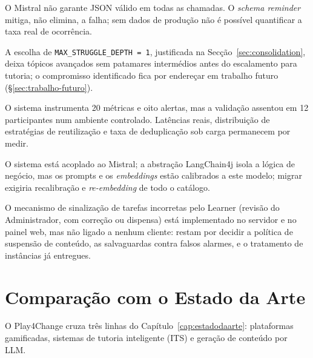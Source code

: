 \begin{description}[style=nextline, font=\bfseries]

\item[Conformidade de schema do LLM]
O Mistral não garante JSON válido em todas as chamadas. O \textit{schema reminder} mitiga, não elimina, a falha; sem dados de produção não é possível quantificar a taxa real de ocorrência.

\item[Profundidade fixa de struggle]
A escolha de \texttt{MAX\_STRUGGLE\_DEPTH~=~1}, justificada na Secção~\ref{sec:consolidation}, deixa tópicos avançados sem patamares intermédios antes do escalamento para tutoria; o compromisso identificado fica por endereçar em trabalho futuro (§\ref{sec:trabalho-futuro}).

\item[Falta de dados de produção]
O sistema instrumenta 20 métricas e oito alertas, mas a validação assentou em 12 participantes num ambiente controlado. Latências reais, distribuição de estratégias de reutilização e taxa de deduplicação sob carga permanecem por medir.

\item[Fornecedor de IA único]
O sistema está acoplado ao Mistral; a abstração LangChain4j isola a lógica de negócio, mas os prompts e os \textit{embeddings} estão calibrados a este modelo; migrar exigiria recalibração e \textit{re-embedding} de todo o catálogo.

\item[Contexto \textit{Report} por integrar]
O mecanismo de sinalização de tarefas incorretas pelo Learner (revisão do Administrador, com correção ou dispensa) está implementado no servidor e no painel web, mas não ligado a nenhum cliente: restam por decidir a política de suspensão de conteúdo, as salvaguardas contra falsos alarmes, e o tratamento de instâncias já entregues.

\end{description}

\section{Comparação com o Estado da Arte} \label{sec:comparacao-arte}

O Play4Change cruza três linhas do Capítulo~\ref{cap:estadodaarte}: plataformas gamificadas, sistemas de tutoria inteligente (ITS) e geração de conteúdo por LLM.

